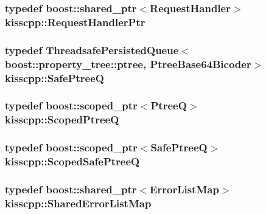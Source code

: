 \hypertarget{a00089_a21e40edcd4f1a3c7c1cc0015b576c8e5}{
\subsubsection[{Request\-Handler\-Ptr}]{\setlength{\rightskip}{0pt plus 5cm}typedef boost\-::shared\-\_\-ptr$<${\bf Request\-Handler}$>$ {\bf kisscpp\-::\-Request\-Handler\-Ptr}}}\label{a00089_a21e40edcd4f1a3c7c1cc0015b576c8e5}
\hypertarget{a00089_ac48ab954f4898861f383b80e857e17cc}{
\subsubsection[{Safe\-Ptree\-Q}]{\setlength{\rightskip}{0pt plus 5cm}typedef {\bf Threadsafe\-Persisted\-Queue}$<$boost\-::property\-\_\-tree\-::ptree, {\bf Ptree\-Base64\-Bicoder}$>$ {\bf kisscpp\-::\-Safe\-Ptree\-Q}}}\label{a00089_ac48ab954f4898861f383b80e857e17cc}
\hypertarget{a00089_a64a7093fe1bdc3f323b469e800eebc7f}{
\subsubsection[{Scoped\-Ptree\-Q}]{\setlength{\rightskip}{0pt plus 5cm}typedef boost\-::scoped\-\_\-ptr$<${\bf Ptree\-Q}$>$ {\bf kisscpp\-::\-Scoped\-Ptree\-Q}}}\label{a00089_a64a7093fe1bdc3f323b469e800eebc7f}
\hypertarget{a00089_a20653e6629a85affc6a1b8529e0a8da0}{
\subsubsection[{Scoped\-Safe\-Ptree\-Q}]{\setlength{\rightskip}{0pt plus 5cm}typedef boost\-::scoped\-\_\-ptr$<${\bf Safe\-Ptree\-Q}$>$ {\bf kisscpp\-::\-Scoped\-Safe\-Ptree\-Q}}}\label{a00089_a20653e6629a85affc6a1b8529e0a8da0}
\hypertarget{a00089_a52b7a11959a119c1da931042d7751db0}{
\subsubsection[{Shared\-Error\-List\-Map}]{\setlength{\rightskip}{0pt plus 5cm}typedef boost\-::shared\-\_\-ptr$<${\bf Error\-List\-Map}$>$ {\bf kisscpp\-::\-Shared\-Error\-List\-Map}}}\label{a00089_a52b7a11959a119c1da931042d7751db0}

